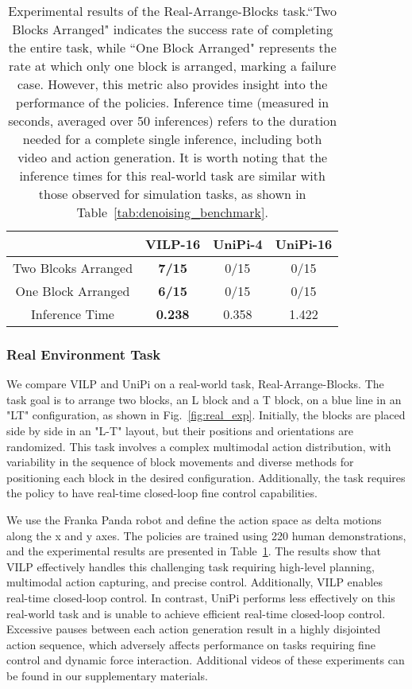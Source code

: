 \documentclass[doublecolumn]{IEEEtran}
\begin{document}
\begin{table}[t]
\centering
{
\begin{tabular}{|c|c|c|c|}
\hline
                    & VILP-16 & UniPi-4 & UniPi-16 \\ \hline
Two Blcoks Arranged & \textbf{7/15}    & 0/15    & 0/15     \\ \cline{1-1}
One Block Arranged  & \textbf{6/15}   & 0/15    & 0/15     \\ \cline{1-1}
Inference Time      & \textbf{0.238}   & 0.358   & 1.422    \\ \hline
\end{tabular}}
\caption{{Experimental results of the Real-Arrange-Blocks task.``Two Blocks Arranged" indicates the success rate of completing the entire task, while ``One Block Arranged" represents the rate at which only one block is arranged, marking a failure case. However, this metric also provides insight into the performance of the policies. Inference time (measured in seconds, averaged over 50 inferences) refers to the duration needed for a complete single inference, including both video and action generation. It is worth noting that the inference times for this real-world task are similar with those observed for simulation tasks, as shown in Table~\ref{tab:denoising_benchmark}.}}
\label{tab:real_sr}
\end{table}

\subsubsection{Real Environment Task}
{We compare VILP and UniPi on a real-world task, Real-Arrange-Blocks. The task goal is to arrange two blocks, an L block and a T block, on a blue line in an "LT" configuration, as shown in Fig.~\ref{fig:real_exp}. Initially, the blocks are placed side by side in an "L-T" layout, but their positions and orientations are randomized. This task involves a complex multimodal action distribution, with variability in the sequence of block movements and diverse methods for positioning each block in the desired configuration. Additionally, the task requires the policy to have real-time closed-loop fine control capabilities.}

{We use the Franka Panda robot and define the action space as delta motions along the x and y axes. The policies are trained using 220 human demonstrations, and the experimental results are presented in Table~\ref{tab:real_sr}. The results show that VILP effectively handles this challenging task requiring high-level planning, multimodal action capturing, and precise control. Additionally, VILP enables real-time closed-loop control. In contrast, UniPi performs less effectively on this real-world task and is unable to achieve efficient real-time closed-loop control. Excessive pauses between each action generation result in a highly disjointed action sequence, which adversely affects performance on tasks requiring fine control and dynamic force interaction. Additional videos of these experiments can be found in our supplementary materials.}
\end{document}
